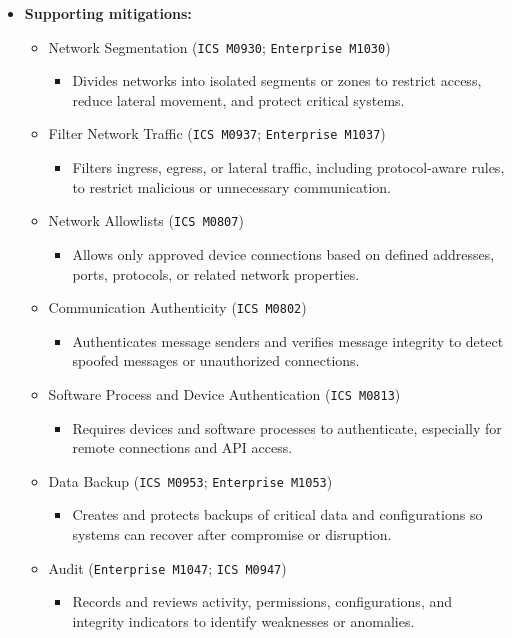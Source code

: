 \documentclass[10pt,a4paper,oneside]{report}
\begin{document}
\begin{itemize}
\item \textbf{Supporting mitigations:}
\begin{itemize}
\item Network Segmentation (\texttt{ICS M0930}; \texttt{Enterprise M1030})
\begin{itemize}
\item Divides networks into isolated segments or zones to restrict access, reduce lateral movement, and protect critical systems.
\end{itemize}
\item Filter Network Traffic (\texttt{ICS M0937}; \texttt{Enterprise M1037})
\begin{itemize}
\item Filters ingress, egress, or lateral traffic, including protocol-aware rules, to restrict malicious or unnecessary communication.
\end{itemize}
\item Network Allowlists (\texttt{ICS M0807})
\begin{itemize}
\item Allows only approved device connections based on defined addresses, ports, protocols, or related network properties.
\end{itemize}
\item Communication Authenticity (\texttt{ICS M0802})
\begin{itemize}
\item Authenticates message senders and verifies message integrity to detect spoofed messages or unauthorized connections.
\end{itemize}
\item Software Process and Device Authentication (\texttt{ICS M0813})
\begin{itemize}
\item Requires devices and software processes to authenticate, especially for remote connections and API access.
\end{itemize}
\item Data Backup (\texttt{ICS M0953}; \texttt{Enterprise M1053})
\begin{itemize}
\item Creates and protects backups of critical data and configurations so systems can recover after compromise or disruption.
\end{itemize}
\item Audit (\texttt{Enterprise M1047}; \texttt{ICS M0947})
\begin{itemize}
\item Records and reviews activity, permissions, configurations, and integrity indicators to identify weaknesses or anomalies.
\end{itemize}
\end{itemize}
\end{itemize}
\end{document}

